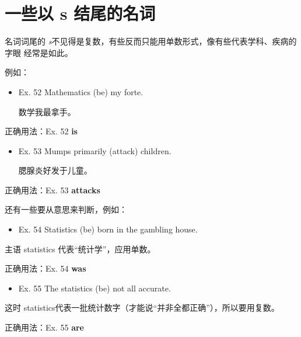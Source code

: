 \section{一些以 s 结尾的名词}

名词词尾的 \emph{s}不见得是复数，有些反而只能用单数形式，像有些代表学科、疾病的字眼
经常是如此。

例如：
\begin{mybox}

\begin{itemize}
\item Ex. 52 Mathematics (be) my forte.

  数学我最拿手。
\end{itemize}

\tcblower

正确用法：Ex. 52 \textbf{is}
\end{mybox}


\begin{mybox}

\begin{itemize}
\item   Ex. 53 Mumps primarily (attack) children.

  腮腺炎好发于儿童。
\end{itemize}

\tcblower

正确用法：Ex. 53 \textbf{attacks}
\end{mybox}

还有一些要从意思来判断，例如：
\begin{mybox}
\begin{itemize}
\item Ex. 54 Statistics (be) born in the gambling house.
\end{itemize}

主语 statistics 代表“统计学”，应用单数。

\tcblower

正确用法：Ex. 54 \textbf{was}
\end{mybox}


\begin{mybox}

\begin{itemize}
\item   Ex. 55 The statistics (be) not all accurate.
\end{itemize}

这时 statistics代表一批统计数字（才能说“并非全都正确”），所以要用复数。

\tcblower

正确用法：Ex. 55 \textbf{are}
\end{mybox}

